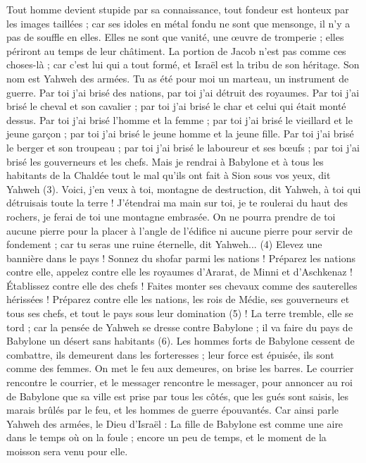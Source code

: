 \begin{multicols}{2}
Tout homme devient stupide par sa connaissance, tout fondeur est honteux par les images taillées ; car ses idoles en métal fondu ne sont que mensonge, il n'y a pas de souffle en elles.
Elles ne sont que vanité, une œuvre de tromperie ; elles périront au temps de leur châtiment.
La portion de Jacob n'est pas comme ces choses-là ; car c'est lui qui a tout formé, et Israël est la tribu de son héritage. Son nom est Yahweh des armées.
Tu as été pour moi un marteau, un instrument de guerre. Par toi j'ai brisé des nations, par toi j'ai détruit des royaumes.
Par toi j'ai brisé le cheval et son cavalier ; par toi j'ai brisé le char et celui qui était monté dessus.
Par toi j'ai brisé l'homme et la femme ; par toi j'ai brisé le vieillard et le jeune garçon ; par toi j'ai brisé le jeune homme et la jeune fille.
Par toi j'ai brisé le berger et son troupeau ; par toi j'ai brisé le laboureur et ses bœufs ; par toi j'ai brisé les gouverneurs et les chefs.
Mais je rendrai à Babylone et à tous les habitants de la Chaldée tout le mal qu'ils ont fait à Sion sous vos yeux, dit Yahweh\FTNT{} (3).
Voici, j'en veux à toi, montagne de destruction, dit Yahweh, à toi qui détruisais toute la terre ! J'étendrai ma main sur toi, je te roulerai du haut des rochers, je ferai de toi une montagne embrasée.
On ne pourra prendre de toi aucune pierre pour la placer à l'angle de l'édifice ni aucune pierre pour servir de fondement ; car tu seras une ruine éternelle, dit Yahweh...\FTNT{} (4)
Elevez une bannière dans le pays ! Sonnez du shofar parmi les nations ! Préparez les nations contre elle, appelez contre elle les royaumes d'Ararat, de Minni et d'Aschkenaz ! Établissez contre elle des chefs ! Faites monter ses chevaux comme des sauterelles hérissées !
Préparez contre elle les nations, les rois de Médie, ses gouverneurs et tous ses chefs, et tout le pays sous leur domination\FTNT{} (5) !
La terre tremble, elle se tord ; car la pensée de Yahweh se dresse contre Babylone ; il va faire du pays de Babylone un désert sans habitants\FTNT{} (6).
Les hommes forts de Babylone cessent de combattre, ils demeurent dans les forteresses ; leur force est épuisée, ils sont comme des femmes. On met le feu aux demeures, on brise les barres.
Le courrier rencontre le courrier, et le messager rencontre le messager, pour annoncer au roi de Babylone que sa ville est prise par tous les côtés,
que les gués sont saisis, les marais brûlés par le feu, et les hommes de guerre épouvantés.
Car ainsi parle Yahweh des armées, le Dieu d'Israël : La fille de Babylone est comme une aire dans le temps où on la foule ; encore un peu de temps, et le moment de la moisson sera venu pour elle.

\end{multicols}
